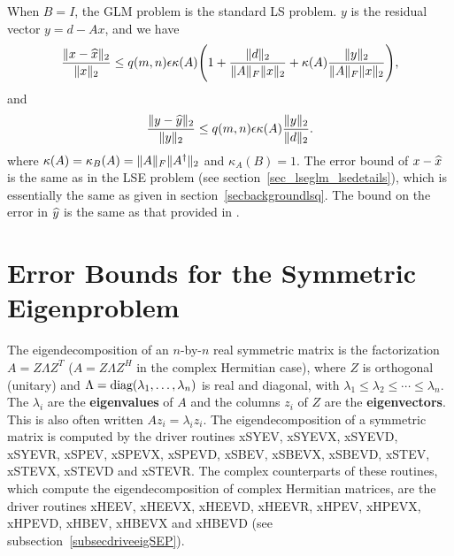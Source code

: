 \vspace*{.2in}

\noindent
When $B = I$, the GLM problem is the standard LS problem.
$y$ is the residual vector $y = d - Ax$, and we have
$$
 \frac{\| x-\widehat{x} \|_2}{\| x \|_2} \leq q(m,n)\epsilon
      \kappa(A)\Bigg( 1 + \frac{\| d \|_2}{\| A \|_F\| x \|_2}
         + \kappa(A)\frac{\| y \|_2}{\| A \|_F\| x \|_2} \Bigg),
$$
and
$$
  \frac{\| y - \widehat{y} \|_2}{\| y \|_2} \leq q(m,n)\epsilon
         \kappa(A)\frac{\| y \|_2}{\| d \|_2} .
$$
where $\kappa(A) = \kappa_B(A) = \| A \|_F\| A^\dagger \|_2$ and
$\kappa_A(B) = 1$.  The error bound of $x-\widehat{x}$ is the same
as in the LSE problem (see section~\ref{sec_lseglm_lsedetails}),
which is essentially the same as given in section~\ref{secbackgroundlsq}.
The bound on the error in $\widehat{y}$ is the same as that provided
in \cite[section 5.3.7]{GVL2}. \\

\section{Error Bounds for the Symmetric Eigenproblem }\label{secsym}

The eigendecomposition of
an $n$-by-$n$ real symmetric matrix is the
factorization $A=Z \Lambda Z^T$ ($A= Z \Lambda Z^H$ in the complex Hermitian
case), where $Z$ is orthogonal (unitary) and
$\Lambda = {\mbox {\rm diag}} ( \lambda_1 , \ldots , \lambda_n )$ is real and diagonal,
with $\lambda_1 \leq \lambda_2 \leq \cdots \leq \lambda_n$.
The $\lambda_i$ are the {\bf eigenvalues} of $A$ and the columns $z_i$ of
$Z$ are the {\bf eigenvectors}. This is also often written
$A z_i = \lambda_i z_i$. The eigendecomposition of a symmetric matrix is
computed
by the driver routines
xSYEV, xSYEVX, xSYEVD, xSYEVR,
xSPEV, xSPEVX, xSPEVD,
xSBEV, xSBEVX, xSBEVD,
xSTEV, xSTEVX, xSTEVD and xSTEVR.
The complex counterparts of these routines, which compute the
eigendecomposition of complex Hermitian matrices, are
the driver routines
xHEEV, xHEEVX, xHEEVD, xHEEVR,
xHPEV, xHPEVX, xHPEVD,
xHBEV, xHBEVX and xHBEVD
(see subsection~\ref{subsecdriveeigSEP}).

